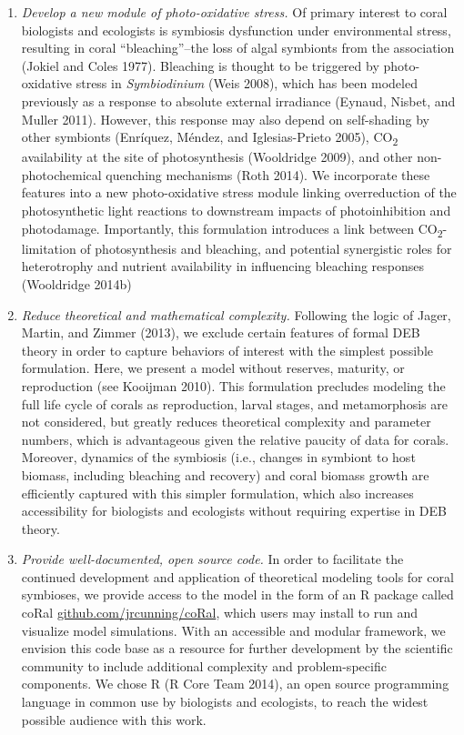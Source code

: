 \documentclass[]{elsarticle} %
\begin{document}
\begin{enumerate}
\def\labelenumi{\arabic{enumi}.}
\item
  \emph{Develop a new module of photo-oxidative stress.} Of primary
  interest to coral biologists and ecologists is symbiosis dysfunction
  under environmental stress, resulting in coral ``bleaching''--the loss
  of algal symbionts from the association (Jokiel and Coles 1977).
  Bleaching is thought to be triggered by photo-oxidative stress in
  \emph{Symbiodinium} (Weis 2008), which has been modeled previously as
  a response to absolute external irradiance (Eynaud, Nisbet, and Muller
  2011). However, this response may also depend on self-shading by other
  symbionts (Enríquez, Méndez, and Iglesias-Prieto 2005),
  CO\textsubscript{2} availability at the site of photosynthesis
  (Wooldridge 2009), and other non-photochemical quenching mechanisms
  (Roth 2014). We incorporate these features into a new photo-oxidative
  stress module linking overreduction of the photosynthetic light
  reactions to downstream impacts of photoinhibition and photodamage.
  Importantly, this formulation introduces a link between
  CO\textsubscript{2}-limitation of photosynthesis and bleaching, and
  potential synergistic roles for heterotrophy and nutrient availability
  in influencing bleaching responses (Wooldridge 2014b)
\item
  \emph{Reduce theoretical and mathematical complexity.} Following the
  logic of Jager, Martin, and Zimmer (2013), we exclude certain features
  of formal DEB theory in order to capture behaviors of interest with
  the simplest possible formulation. Here, we present a model without
  reserves, maturity, or reproduction (see Kooijman 2010). This
  formulation precludes modeling the full life cycle of corals as
  reproduction, larval stages, and metamorphosis are not considered, but
  greatly reduces theoretical complexity and parameter numbers, which is
  advantageous given the relative paucity of data for corals. Moreover,
  dynamics of the symbiosis (i.e., changes in symbiont to host biomass,
  including bleaching and recovery) and coral biomass growth are
  efficiently captured with this simpler formulation, which also
  increases accessibility for biologists and ecologists without
  requiring expertise in DEB theory.
\item
  \emph{Provide well-documented, open source code.} In order to
  facilitate the continued development and application of theoretical
  modeling tools for coral symbioses, we provide access to the model in
  the form of an R package called coRal
  \url{github.com/jrcunning/coRal}, which users may install to run and
  visualize model simulations. With an accessible and modular framework,
  we envision this code base as a resource for further development by
  the scientific community to include additional complexity and
  problem-specific components. We chose R (R Core Team 2014), an open
  source programming language in common use by biologists and
  ecologists, to reach the widest possible audience with this work.
\end{enumerate}
\end{document}
